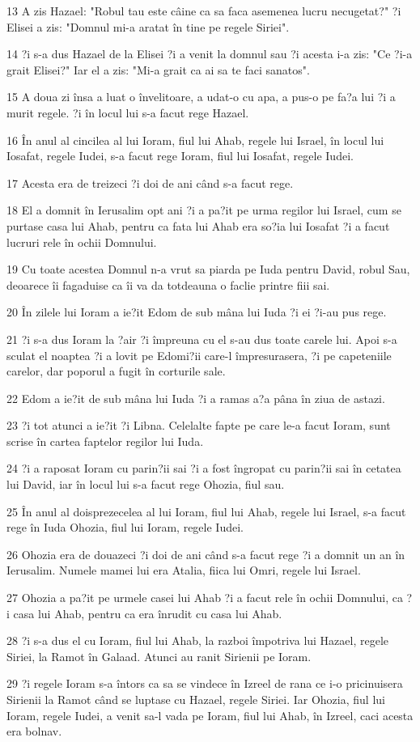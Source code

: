\par 13 A zis Hazael: "Robul tau este câine ca sa faca asemenea lucru necugetat?" ?i Elisei a zis: "Domnul mi-a aratat în tine pe regele Siriei".
\par 14 ?i s-a dus Hazael de la Elisei ?i a venit la domnul sau ?i acesta i-a zis: "Ce ?i-a grait Elisei?" Iar el a zis: "Mi-a grait ca ai sa te faci sanatos".
\par 15 A doua zi însa a luat o învelitoare, a udat-o cu apa, a pus-o pe fa?a lui ?i a murit regele. ?i în locul lui s-a facut rege Hazael.
\par 16 În anul al cincilea al lui Ioram, fiul lui Ahab, regele lui Israel, în locul lui Iosafat, regele Iudei, s-a facut rege Ioram, fiul lui Iosafat, regele Iudei.
\par 17 Acesta era de treizeci ?i doi de ani când s-a facut rege.
\par 18 El a domnit în Ierusalim opt ani ?i a pa?it pe urma regilor lui Israel, cum se purtase casa lui Ahab, pentru ca fata lui Ahab era so?ia lui Iosafat ?i a facut lucruri rele în ochii Domnului.
\par 19 Cu toate acestea Domnul n-a vrut sa piarda pe Iuda pentru David, robul Sau, deoarece îi fagaduise ca îi va da totdeauna o faclie printre fiii sai.
\par 20 În zilele lui Ioram a ie?it Edom de sub mâna lui Iuda ?i ei ?i-au pus rege.
\par 21 ?i s-a dus Ioram la ?air ?i împreuna cu el s-au dus toate carele lui. Apoi s-a sculat el noaptea ?i a lovit pe Edomi?ii care-l împresurasera, ?i pe capeteniile carelor, dar poporul a fugit în corturile sale.
\par 22 Edom a ie?it de sub mâna lui Iuda ?i a ramas a?a pâna în ziua de astazi.
\par 23 ?i tot atunci a ie?it ?i Libna. Celelalte fapte pe care le-a facut Ioram, sunt scrise în cartea faptelor regilor lui Iuda.
\par 24 ?i a raposat Ioram cu parin?ii sai ?i a fost îngropat cu parin?ii sai în cetatea lui David, iar în locul lui s-a facut rege Ohozia, fiul sau.
\par 25 În anul al doisprezecelea al lui Ioram, fiul lui Ahab, regele lui Israel, s-a facut rege în Iuda Ohozia, fiul lui Ioram, regele Iudei.
\par 26 Ohozia era de douazeci ?i doi de ani când s-a facut rege ?i a domnit un an în Ierusalim. Numele mamei lui era Atalia, fiica lui Omri, regele lui Israel.
\par 27 Ohozia a pa?it pe urmele casei lui Ahab ?i a facut rele în ochii Domnului, ca ?i casa lui Ahab, pentru ca era înrudit cu casa lui Ahab.
\par 28 ?i s-a dus el cu Ioram, fiul lui Ahab, la razboi împotriva lui Hazael, regele Siriei, la Ramot în Galaad. Atunci au ranit Sirienii pe Ioram.
\par 29 ?i regele Ioram s-a întors ca sa se vindece în Izreel de rana ce i-o pricinuisera Sirienii la Ramot când se luptase cu Hazael, regele Siriei. Iar Ohozia, fiul lui Ioram, regele Iudei, a venit sa-l vada pe Ioram, fiul lui Ahab, în Izreel, caci acesta era bolnav.

